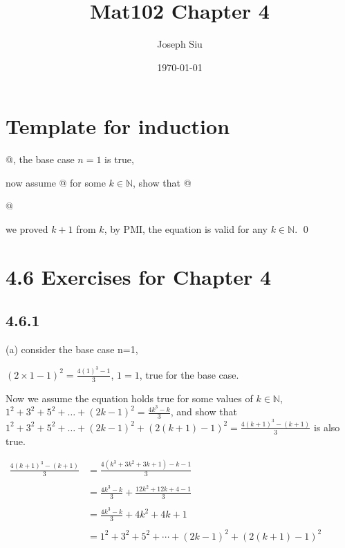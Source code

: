 \documentclass{article}
\title{Mat102 Chapter 4}
\author{Joseph Siu}
\date{\today}
\begin{document}
\maketitle

\section*{Template for induction}

@, the base case $n=1$ is true,

now assume @ for some $k\in \mathbb{N}$, show that @

\begin{center}
    @
\end{center}

we proved $k+1$ from $k$, by PMI, the equation is valid for any $k\in \mathbb{N}$. \qed





\section*{4.6 Exercises for Chapter 4}

\subsection*{4.6.1}

(a) consider the base case n=1,

$(2\times1-1)^2=\frac{4(1)^3-1}{3}$, $1=1$, true for the base case.

Now we assume the equation holds true for some values of $k\in \mathbb{N}$, $1^2+3^2+5^2+\dots+(2k-1)^2=\frac{4k^3-k}{3}$, and show that $1^2+3^2+5^2+\dots+(2k-1)^2+(2(k+1)-1)^2=\frac{4(k+1)^3-(k+1)}{3}$ is also true.

\begin{center}
$\begin{aligned}\frac{4\left(k+1\right)^3-\left(k+1\right)}3&=\frac{4\left(k^3+3k^2+3k+1\right)-k-1}3\\\\&=\frac{4k^3-k}3+\frac{12k^2+12k+4-1}3\\\\&=\frac{4k^3-k}3+4k^2+4k+1\\\\&=1^2+3^2+5^2+\cdots+\left(2k-1\right)^2+\left(2\left(k+1\right)-1\right)^2\end{aligned}$
\end{center}
\end{document}
